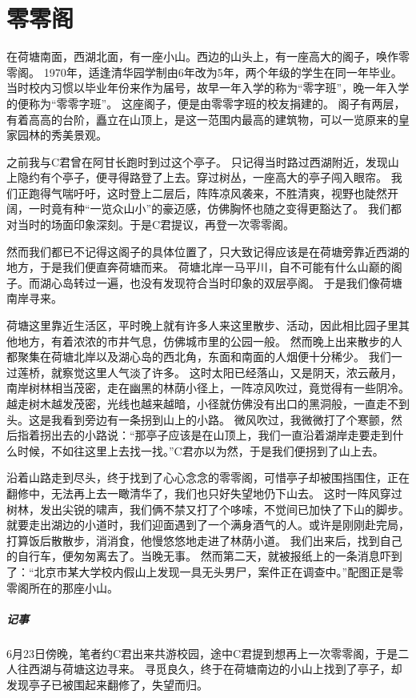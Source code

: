 \chapter{零零阁}

在荷塘南面，西湖北面，有一座小山。西边的山头上，有一座高大的阁子，唤作零零阁。%
1970年，适逢清华园学制由6年改为5年，两个年级的学生在同一年毕业。
当时校内习惯以毕业年份来作为届号，故早一年入学的称为“零字班”，晚一年入学的便称为“零零字班”。
这座阁子，便是由零零字班的校友捐建的。
阁子有两层，有着高高的台阶，矗立在山顶上，是这一范围内最高的建筑物，可以一览原来的皇家园林的秀美景观。

之前我与C君曾在阿甘长跑时到过这个亭子。
只记得当时路过西湖附近，发现山上隐约有个亭子，便寻得路登了上去。穿过树丛，一座高大的亭子闯入眼帘。
我们正跑得气喘吁吁，这时登上二层后，阵阵凉风袭来，不胜清爽，视野也陡然开阔，一时竟有种“一览众山小”的豪迈感，仿佛胸怀也随之变得更豁达了。
我们都对当时的场面印象深刻。于是C君提议，再登一次零零阁。

然而我们都已不记得这阁子的具体位置了，只大致记得应该是在荷塘旁靠近西湖的地方，于是我们便直奔荷塘而来。
荷塘北岸一马平川，自不可能有什么山巅的阁子。而湖心岛转过一遍，也没有发现符合当时印象的双层亭阁。
于是我们像荷塘南岸寻来。

荷塘这里靠近生活区，平时晚上就有许多人来这里散步、活动，因此相比园子里其他地方，有着浓浓的市井气息，仿佛城市里的公园一般。
然而晚上出来散步的人都聚集在荷塘北岸以及湖心岛的西北角，东面和南面的人烟便十分稀少。
我们一过莲桥，就察觉这里人气淡了许多。
这时太阳已经落山，又是阴天，浓云蔽月，南岸树林相当茂密，走在幽黑的林荫小径上，一阵凉风吹过，竟觉得有一些阴冷。
越走树木越发茂密，光线也越来越暗，小径就仿佛没有出口的黑洞般，一直走不到头。这是我看到旁边有一条拐到山上的小路。
微风吹过，我微微打了个寒颤，然后指着拐出去的小路说：“那亭子应该是在山顶上，我们一直沿着湖岸走要走到什么时候，不如往这里上去找一找。”C君亦以为然，于是我们便拐到了山上去。

沿着山路走到尽头，终于找到了心心念念的零零阁，可惜亭子却被围挡围住，正在翻修中，无法再上去一瞰清华了，我们也只好失望地仍下山去。
这时一阵风穿过树林，发出尖锐的啸声，我们俩不禁又打了个哆嗦，不觉间已加快了下山的脚步。
就要走出湖边的小道时，我们迎面遇到了一个满身酒气的人。或许是刚刚赴完局，打算饭后散散步，消消食，他慢悠悠地走进了林荫小道。
我们出来后，找到自己的自行车，便匆匆离去了。当晚无事。
然而第二天，就被报纸上的一条消息吓到了：“北京市某大学校内假山上发现一具无头男尸，案件正在调查中。”配图正是零零阁所在的那座小山。

\vfill

\paragraph{记事}
6月23日傍晚，笔者约C君出来共游校园，途中C君提到想再上一次零零阁，于是二人往西湖与荷塘这边寻来。
寻觅良久，终于在荷塘南边的小山上找到了亭子，却发现亭子已被围起来翻修了，失望而归。
